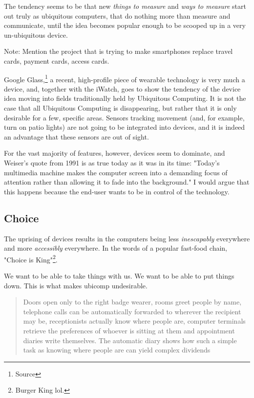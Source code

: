 The tendency seems to be that new \emph{things to measure} and \emph{ways to measure} start out truly as ubiquitous computers, that do
nothing more than measure and communicate, until the idea becomes popular enough to be scooped up in a very un-ubiquitous device.

Note: Mention the project that is trying to make smartphones replace travel cards, payment cards, access cards.

Google Glass,\footnote{Source} a recent, high-profile piece of wearable technology is very much a device, and, together with the iWatch,
goes to show the tendency of the device idea moving into fields traditionally held by Ubiquitous Computing. It is not the case that all
Ubiquitous Computing is disappearing, but rather that it is only desirable for a few, specific areas. Sensors tracking movement (and, for
example, turn on patio lights) are not going to be integrated into devices, and it is indeed an advantage that these sensors are out of sight.

For the vast majority of features, however, devices seem to dominate, and Weiser's quote from 1991 is as true today as it was in its
time: "Today's multimedia machine makes the computer screen into a demanding focus of attention rather than allowing it to fade into the
background."\cite{weiser91} I would argue that this happens because the end-user wants to be in control of the technology.

\subsection*{Choice}

The uprising of devices results in the computers being less \emph{inescapably} everywhere and more \emph{accessibly} everywhere. In the words
of a popular fast-food chain, "Choice is King"\footnote{Burger King lol.}.

We want to be able to take things with us. We want to be able to put things down. This is what makes ubicomp undesirable.

\begin{quote}
    Doors open only to the right badge wearer, rooms greet people by name, telephone calls can be automatically forwarded to wherever the recipient may be, receptionists actually know where people are, computer terminals retrieve the preferences of whoever is sitting at them and appointment diaries write themselves. The automatic diary shows how such a simple task as knowing where people are can yield complex dividends\cite{weiser91}
\end{quote}

